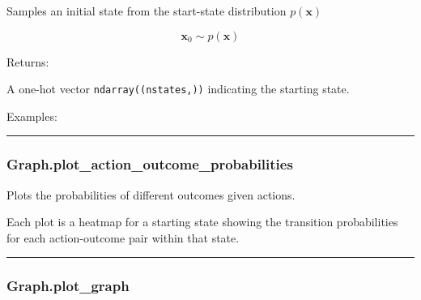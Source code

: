 Samples an initial state from the start-state distribution
\(p(\mathbf x)\)

\[
\mathbf x_0 \sim p(\mathbf x)
\]

Returns:

A one-hot vector \texttt{ndarray((nstates,))} indicating the starting
state.

Examples:

\begin{Shaded}
\begin{Highlighting}[]
\OperatorTok{=}
\end{Highlighting}
\end{Shaded}

\begin{center}\rule{0.5\linewidth}{\linethickness}\end{center}

\subsubsection{Graph.plot\_action\_outcome\_probabilities}\label{graph.plot_action_outcome_probabilities}

\begin{Shaded}
\begin{Highlighting}[]
\OperatorTok{=}\OperatorTok{=}\OperatorTok{=}\OperatorTok{=}\NormalTok{)}
\end{Highlighting}
\end{Shaded}

Plots the probabilities of different outcomes given actions.

Each plot is a heatmap for a starting state showing the transition
probabilities for each action-outcome pair within that state.

\begin{center}\rule{0.5\linewidth}{\linethickness}\end{center}

\subsubsection{Graph.plot\_graph}\label{graph.plot_graph}

\begin{Shaded}
\begin{Highlighting}[]
\OperatorTok{=}\OperatorTok{=}\OperatorTok{=}\OperatorTok{=}\OperatorTok{=}\OperatorTok{=}\OperatorTok{=}\OperatorTok{=}\NormalTok{)}
\end{Highlighting}
\end{Shaded}

